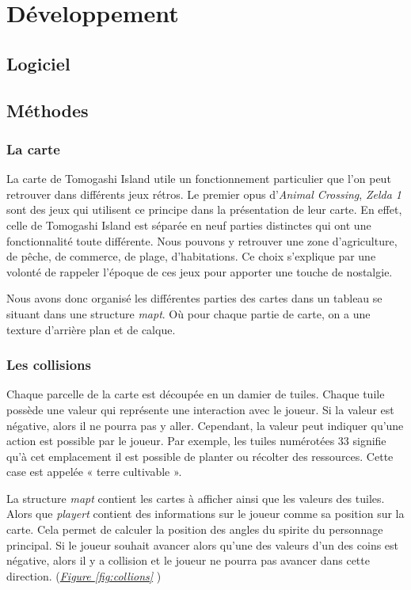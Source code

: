 \documentclass{article}
\begin{document}
\section{Développement}
    \subsection{Logiciel}
    \subsection{Méthodes}
        \subsubsection{La carte}
        La carte de Tomogashi Island utile un fonctionnement particulier que l’on peut retrouver dans différents jeux rétros. Le premier opus d’\textit{Animal Crossing}, \textit{Zelda 1} sont des jeux qui utilisent ce principe dans la présentation de leur carte. En effet, celle de Tomogashi Island  est séparée en neuf parties distinctes qui ont une fonctionnalité toute différente. Nous pouvons y retrouver une zone d’agriculture, de pêche, de commerce, de plage, d'habitations. Ce choix s'explique par une volonté de rappeler l'époque de ces jeux pour apporter une touche de nostalgie.


        Nous avons donc organisé les différentes parties des cartes dans un tableau se situant dans une structure \textit{map\textunderscore t}. Où pour chaque partie de carte, on a une texture d'arrière plan et de calque.
        
        \subsubsection{Les collisions}
        Chaque parcelle de la carte est découpée en un damier de tuiles. Chaque tuile possède une valeur qui représente une interaction avec le joueur. Si la valeur est négative, alors il ne pourra pas y aller. Cependant, la valeur peut indiquer qu'une action est possible par le joueur. Par exemple, les tuiles numérotées 33 signifie qu'à cet emplacement il est possible de planter ou récolter des ressources. Cette case est appelée « terre cultivable ».

        La structure \textit{map\textunderscore t} contient les cartes à afficher ainsi que les valeurs des tuiles. Alors que \textit{player\textunderscore t} contient des informations sur le joueur comme sa position sur la carte. Cela permet de calculer la position des angles du spirite du personnage principal. Si le joueur souhait avancer alors qu'une des valeurs d'un des coins est négative, alors il y a collision et le joueur ne pourra pas avancer dans cette direction. (\textit{\hyperref[fig:collions]{Figure \ref{fig:collions}}} )
\end{document}

